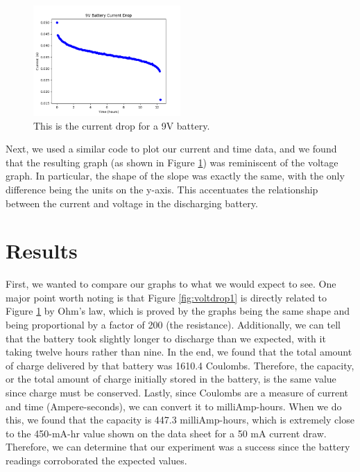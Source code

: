 \documentclass{article}
\begin{document}
\begin{figure}[h]
    \centering
    \includegraphics[width=0.5\textwidth]{CurrentDischarge.png}
    \caption{This is the current drop for a 9V battery.}
    \label{fig:currdischarge}

\end{figure}

Next, we used a similar code to plot our current and time data, and we found that the resulting graph (as shown in Figure \ref{fig:currdischarge}) was reminiscent of the voltage graph. In particular, the shape of the slope was exactly the same, with the only difference being the units on the y-axis. This accentuates the relationship between the current and voltage in the discharging battery.

\pagebreak
\section{Results}
First, we wanted to compare our graphs to what we would expect to see. One major point worth noting is that Figure \ref{fig:voltdrop1} is directly related to Figure \ref{fig:currdischarge} by Ohm’s law, which is proved by the graphs being the same shape and being proportional by a factor of 200 (the resistance). Additionally, we can tell that the battery took slightly longer to discharge than we expected, with it taking twelve hours rather than nine.
In the end, we found that the total amount of charge delivered by that battery was 1610.4 Coulombs. Therefore, the capacity, or the total amount of charge initially stored in the battery, is the same value since charge must be conserved. Lastly, since Coulombs are a measure of current and time (Ampere-seconds), we can convert it to milliAmp-hours. When we do this, we found that the capacity is 447.3 milliAmp-hours, which is extremely close to the 450-mA-hr value shown on the data sheet for a 50 mA current draw. \cite{datasheet} Therefore, we can determine that our experiment was a success since the battery readings corroborated the expected values.



\end{document}
